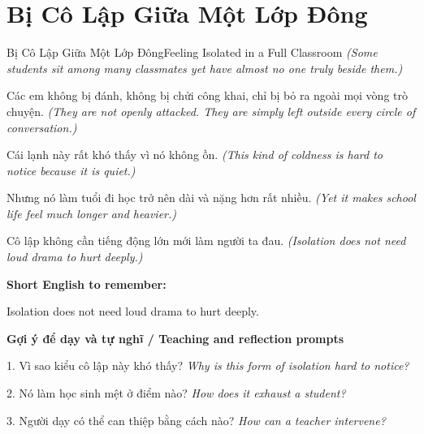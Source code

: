 \section{Bị Cô Lập Giữa Một Lớp Đông}
\begin{truyen}{Bị Cô Lập Giữa Một Lớp Đông}{Feeling Isolated in a Full Classroom}
\textit{(Some students sit among many classmates yet have almost no one truly beside them.)}

Các em không bị đánh, không bị chửi công khai, chỉ bị bỏ ra ngoài mọi vòng trò chuyện.
\textit{(They are not openly attacked. They are simply left outside every circle of conversation.)}

Cái lạnh này rất khó thấy vì nó không ồn.
\textit{(This kind of coldness is hard to notice because it is quiet.)}

Nhưng nó làm tuổi đi học trở nên dài và nặng hơn rất nhiều.
\textit{(Yet it makes school life feel much longer and heavier.)}

\end{truyen}

\begin{baihoc}
Cô lập không cần tiếng động lớn mới làm người ta đau.
\textit{(Isolation does not need loud drama to hurt deeply.)}
\end{baihoc}

\begin{ghinhoanh}
\textbf{Short English to remember:}

Isolation does not need loud drama to hurt deeply.

\end{ghinhoanh}

\begin{tuhocnhanh}
\textbf{Gợi ý để dạy và tự nghĩ / Teaching and reflection prompts}

1. Vì sao kiểu cô lập này khó thấy? \textit{Why is this form of isolation hard to notice?}

2. Nó làm học sinh mệt ở điểm nào? \textit{How does it exhaust a student?}

3. Người dạy có thể can thiệp bằng cách nào? \textit{How can a teacher intervene?}
\end{tuhocnhanh}
\ngancach

